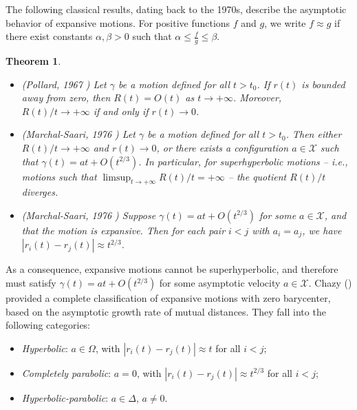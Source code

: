 \documentclass[a4paper,10pt]{amsart}
\theoremstyle{plain}
\newtheorem{thm}{Theorem}
\theoremstyle{definition}
\numberwithin{equation}{section}
\numberwithin{thm}{section}
\begin{document}
The following classical results, dating back to the 1970s, describe the asymptotic behavior of expansive motions. For positive functions $f$ and $g$, we write $f \approx g$ if there exist constants $\alpha, \beta > 0$ such that $\alpha \leq \frac{f}{g} \leq \beta$.

\begin{thm}\label{PollardTheorem}
\begin{itemize}
    \item[$(i)$] (Pollard, 1967 \cite{Pollard_BehaviorOfGravitationalSystems}) Let $\gamma$ be a motion defined for all $t > t_0$. If $r(t)$ is bounded away from zero, then $R(t) = O(t)$ as $t \rightarrow +\infty$. Moreover, $R(t)/t \rightarrow +\infty$ if and only if $r(t) \rightarrow 0$.
    
    \item[$(ii)$] (Marchal-Saari, 1976 \cite{MarchalSaari_FinalEvolution}) Let $\gamma$ be a motion defined for all $t > t_0$. Then either $R(t)/t \to +\infty$ and $r(t) \to 0$, or there exists a configuration $a \in \mathcal{X}$ such that $\gamma(t) = at + O(t^{2/3})$. In particular, for \emph{superhyperbolic} motions -- i.e., motions such that $\limsup_{t \to +\infty} R(t)/t = +\infty$ -- the quotient $R(t)/t$ diverges.
    
    \item[$(iii)$] (Marchal-Saari, 1976 \cite{MarchalSaari_FinalEvolution}) Suppose $\gamma(t) = at + O(t^{2/3})$ for some $a \in \mathcal{X}$, and that the motion is expansive. Then for each pair $i < j$ with $a_i = a_j$, we have $|r_i(t)-r_j(t)| \approx t^{2/3}$.
\end{itemize}
\end{thm}

As a consequence, expansive motions cannot be superhyperbolic, and therefore must satisfy $\gamma(t) = at + O(t^{2/3})$ for some asymptotic velocity $a \in \mathcal{X}$. Chazy (\cite{Chazy}) provided a complete classification of expansive motions with zero barycenter, based on the asymptotic growth rate of mutual distances. They fall into the following categories:
\begin{itemize}
    \item[$(H)$] \textit{Hyperbolic}: $a \in \Omega$, with $|r_i(t) - r_j(t)| \approx t$ for all $i < j$;
    \item[$(P)$] \textit{Completely parabolic}: $a = 0$, with $|r_i(t) - r_j(t)| \approx t^{2/3}$ for all $i < j$;
    \item[$(HP)$] \textit{Hyperbolic-parabolic}: $a \in \Delta$, $a \neq 0$.
\end{itemize}
\end{document}
